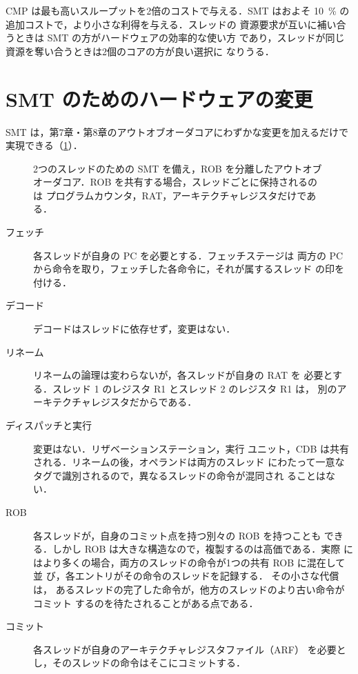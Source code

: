 \documentclass[../main.tex]{subfiles}
\begin{document}
\begin{keypoint}
  CMP は最も高いスループットを2倍のコストで与える．SMT はおよそ
  \SI{10}{\percent} の追加コストで，より小さな利得を与える．スレッドの
  資源要求が互いに補い合うときは SMT の方がハードウェアの効率的な使い方
  であり，スレッドが同じ資源を奪い合うときは2個のコアの方が良い選択に
  なりうる．
\end{keypoint}

\section{SMT のためのハードウェアの変更}
\label{sec:l18-smt-hw}

SMT は，第7章・第8章のアウトオブオーダコアにわずかな変更を加えるだけで
実現できる（\cref{fig:l18-smt-hw}）．

\begin{figure}[htbp]
  \centering
  
  \caption{2つのスレッドのための SMT を備え，ROB を分離したアウトオブ
    オーダコア．ROB を共有する場合，スレッドごとに保持されるのは
    プログラムカウンタ，RAT，アーキテクチャレジスタだけである．}
  \label{fig:l18-smt-hw}
\end{figure}

\begin{description}
  \item[フェッチ] 各スレッドが自身の PC を必要とする．フェッチステージは
    両方の PC から命令を取り，フェッチした各命令に，それが属するスレッド
    の印を付ける．
  \item[デコード] デコードはスレッドに依存せず，変更はない．
  \item[リネーム] リネームの論理は変わらないが，各スレッドが自身の RAT を
    必要とする．スレッド 1 のレジスタ R1 とスレッド 2 のレジスタ R1 は，
    別のアーキテクチャレジスタだからである．
  \item[ディスパッチと実行] 変更はない．リザベーションステーション，実行
    ユニット，CDB は共有される．リネームの後，オペランドは両方のスレッド
    にわたって一意なタグで識別されるので，異なるスレッドの命令が混同され
    ることはない．
  \item[ROB] 各スレッドが，自身のコミット点を持つ別々の ROB を持つことも
    できる．しかし ROB は大きな構造なので，複製するのは高価である．実際
    にはより多くの場合，両方のスレッドの命令が1つの共有 ROB に混在して並
    び，各エントリがその命令のスレッドを記録する．%
    その小さな代償は，
    あるスレッドの完了した命令が，他方のスレッドのより古い命令がコミット
    するのを待たされることがある点である．
  \item[コミット] 各スレッドが自身のアーキテクチャレジスタファイル（ARF）
    を必要とし，そのスレッドの命令はそこにコミットする．
\end{description}
\end{document}
